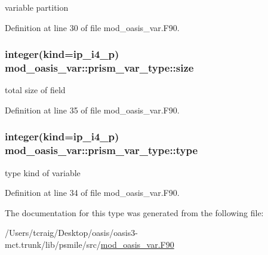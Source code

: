 variable partition 



Definition at line 30 of file mod\+\_\+oasis\+\_\+var.\+F90.

\hypertarget{structmod__oasis__var_1_1prism__var__type_a13dac48e592591a9e06999aadaf1e6b7}{
\subsubsection[{size}]{\setlength{\rightskip}{0pt plus 5cm}integer(kind=ip\+\_\+i4\+\_\+p) mod\+\_\+oasis\+\_\+var\+::prism\+\_\+var\+\_\+type\+::size\hspace{0.3cm}{\ttfamily [private]}}}\label{structmod__oasis__var_1_1prism__var__type_a13dac48e592591a9e06999aadaf1e6b7}


total size of field 



Definition at line 35 of file mod\+\_\+oasis\+\_\+var.\+F90.

\hypertarget{structmod__oasis__var_1_1prism__var__type_a944549d5fb1aebecc59ca5dbff9b3222}{
\subsubsection[{type}]{\setlength{\rightskip}{0pt plus 5cm}integer(kind=ip\+\_\+i4\+\_\+p) mod\+\_\+oasis\+\_\+var\+::prism\+\_\+var\+\_\+type\+::type\hspace{0.3cm}{\ttfamily [private]}}}\label{structmod__oasis__var_1_1prism__var__type_a944549d5fb1aebecc59ca5dbff9b3222}


type kind of variable 



Definition at line 34 of file mod\+\_\+oasis\+\_\+var.\+F90.



The documentation for this type was generated from the following file\+:\begin{DoxyCompactItemize}
\item 
/\+Users/tcraig/\+Desktop/oasis/oasis3-\/mct.\+trunk/lib/psmile/src/\hyperlink{mod__oasis__var_8_f90}{mod\+\_\+oasis\+\_\+var.\+F90}\end{DoxyCompactItemize}
